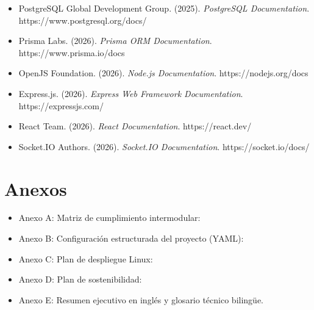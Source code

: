 \documentclass[12pt, a4paper]{report}
\begin{document}
\begin{itemize}
  \item PostgreSQL Global Development Group. (2025). \emph{PostgreSQL Documentation}. https://www.postgresql.org/docs/
  \item Prisma Labs. (2026). \emph{Prisma ORM Documentation}. https://www.prisma.io/docs
  \item OpenJS Foundation. (2026). \emph{Node.js Documentation}. https://nodejs.org/docs
  \item Express.js. (2026). \emph{Express Web Framework Documentation}. https://expressjs.com/
  \item React Team. (2026). \emph{React Documentation}. https://react.dev/
  \item Socket.IO Authors. (2026). \emph{Socket.IO Documentation}. https://socket.io/docs/
\end{itemize}

\chapter{Anexos}

\begin{itemize}
  \item Anexo A: Matriz de cumplimiento intermodular: 
  \item Anexo B: Configuración estructurada del proyecto (YAML): 
  \item Anexo C: Plan de despliegue Linux: 
  \item Anexo D: Plan de sostenibilidad: 
  \item Anexo E: Resumen ejecutivo en inglés y glosario técnico bilingüe.
\end{itemize}
\end{document}
